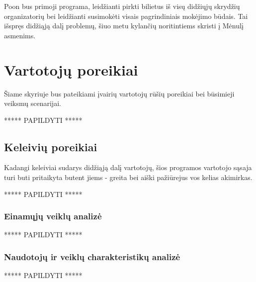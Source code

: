 \documentclass{VUMIFPSkursinis}
\begin{document}
Poon bus primoji programa, leidžianti pirkti bilietus iš visų didžiųjų skrydžių organizatorių bei leidžianti susimokėti visais pagrindiniais mokėjimo būdais. Tai išspręs didžiąją dalį problemų, šiuo metu kylančių noritintiems skristi į Mėnulį asmenims.


\section{Vartotojų poreikiai}
Šiame skyriuje bus pateikiami įvairių vartotojų rūšių poreikiai bei būsimieji veiksmų scenarijai.

\centerline{***** PAPILDYTI *****}

\subsection{Keleivių poreikiai}
Kadangi keleiviai sudarys didžiąją dalį vartotojų, šios programos vartotojo sąsaja turi buti pritaikyta butent jiems - greita bei aiški pažiūrejus vos kelias akimirkas.
\centerline{***** PAPILDYTI *****}

\subsubsection{Einamųjų veiklų analizė}
\centerline{***** PAPILDYTI *****}

\subsubsection{Naudotojų ir veiklų charakteristikų analizė}
\centerline{***** PAPILDYTI *****}
\end{document}

